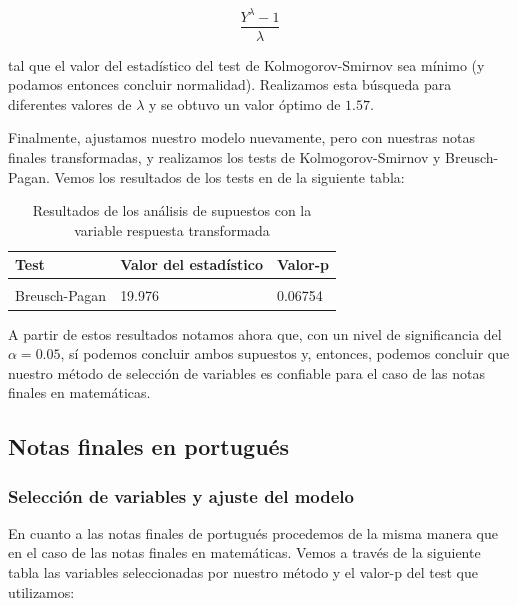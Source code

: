 \documentclass[
]{article}
\begin{document}
\[
\frac{Y^\lambda - 1}{\lambda}
\]

tal que el valor del estadístico del test de Kolmogorov-Smirnov sea
mínimo (y podamos entonces concluir normalidad). Realizamos esta
búsqueda para diferentes valores de \(\lambda\) y se obtuvo un valor
óptimo de \(1.57\).

Finalmente, ajustamos nuestro modelo nuevamente, pero con nuestras notas
finales transformadas, y realizamos los tests de Kolmogorov-Smirnov y
Breusch-Pagan. Vemos los resultados de los tests en de la siguiente
tabla:

\begin{longtable}[t]{lll}
\caption{\label{tab:resultados test mat 2}Resultados de los análisis de supuestos con la variable respuesta transformada}\\
\toprule
Test & Valor del estadístico & Valor-p\\
\midrule
\cellcolor{gray!6}{Kolmogorov-Smirnov} & \cellcolor{gray!6}{0.02298} & \cellcolor{gray!6}{0.9852}\\
Breusch-Pagan & 19.976 & 0.06754\\
\bottomrule
\end{longtable}

A partir de estos resultados notamos ahora que, con un nivel de
significancia del \(\alpha = 0.05\), sí podemos concluir ambos supuestos
y, entonces, podemos concluir que nuestro método de selección de
variables es confiable para el caso de las notas finales en matemáticas.

\hypertarget{notas-finales-en-portuguuxe9s}{%
\subsection{Notas finales en
portugués}\label{notas-finales-en-portuguuxe9s}}

\hypertarget{selecciuxf3n-de-variables-y-ajuste-del-modelo-1}{%
\subsubsection{Selección de variables y ajuste del
modelo}\label{selecciuxf3n-de-variables-y-ajuste-del-modelo-1}}

En cuanto a las notas finales de portugués procedemos de la misma manera
que en el caso de las notas finales en matemáticas. Vemos a través de la
siguiente tabla las variables seleccionadas por nuestro método y el
valor-p del test que utilizamos:
\end{document}
